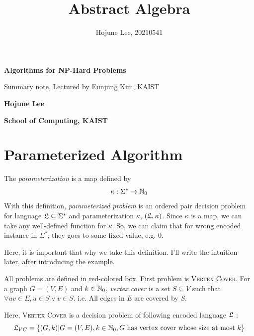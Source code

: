 \documentclass[12pt, a4paper, openany, twoside]{book}
\author{Hojune Lee, 20210541}
\title{Abstract Algebra}
\theoremstyle{definition}
\theoremstyle{remark}
\theoremstyle{plain}
\numberwithin{equation}{section}
\begin{document}
\begin{titlepage}
    \begin{center}
        \vspace*{9cm}
            
        \Huge
        \textbf{Algorithms for NP-Hard Problems}
    
        \vspace{1cm}
        \large
        Summary note, Lectured by Eunjung Kim, KAIST
        \vspace{3cm}
        
        \LARGE
        \textbf{Hojune Lee}
            
        \vspace{8cm}
            
        \normalsize
        \textbf{School of Computing, KAIST}\\  
    \end{center}
\end{titlepage}

\hypersetup{linkcolor=black}
\tableofcontents
\hypersetup{linkcolor=blue}

\newpage 

\chapter{Parameterized Algorithm}

\begin{tcolorbox}[colback=yellow!10!white,colframe=brown!75!black,title=Parameterization]

The \textit{parameterization} is a map defined by 
\[\kappa : \Sigma^* \rightarrow {\mathbb {N}}_0\]
With this definition, \textit{parameterized problem} is an ordered pair decision problem for language ${\mathfrak{L}} \subseteq \Sigma^*$ and parameterization $\kappa$, 
$({\mathfrak{L}}, \kappa)$. Since $\kappa$ is a map, we can take any well-defined function for $\kappa$. So, we can claim that for wrong encoded 
instance in $\Sigma^*$, they goes to some fixed value, e.g. $0$. 

Here, it is important that why we take this definition. I'll write the intuition later, after introducing the example. 
\end{tcolorbox}

\begin{tcolorbox}[colback=yellow!10!white,colframe=red!75!black,title=\textsc{Vertex Cover}]

All problems are defined in red-colored box. First problem is \textsc{Vertex Cover}. For a graph $G = (V, E)$ and $k \in {\mathbb {N}}_0$, 
\textit{vertex cover} is a set $S \subseteq V$ such that $\forall uv \in E, u \in S \vee v \in S$. i.e. All edges in $E$ are covered by $S$. 

Here, \textsc{Vertex Cover} is a decision problem of following encoded language ${\mathfrak{L}}$ : 
\[{\mathfrak{L}}_{VC} = \{(G, k) | G = (V, E), k \in {\mathbb {N}}_0, G \text{ has vertex cover whose size at most } k\}\]

\end{tcolorbox}
\end{document}
